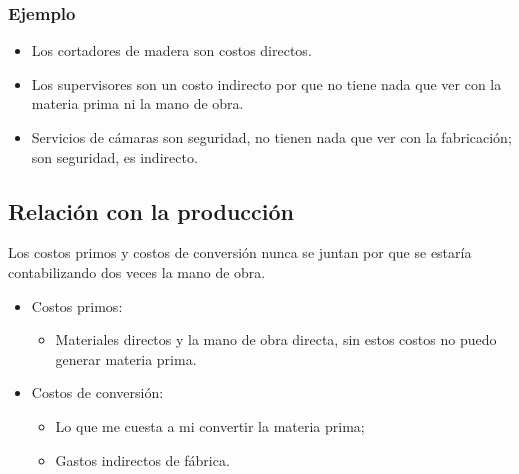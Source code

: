 \subsubsection{Ejemplo}
\begin{itemize}
    \item Los cortadores de madera son costos directos.
    \item Los supervisores son un costo indirecto por que no tiene nada que ver con la materia prima ni la mano de obra.
    \item Servicios de cámaras son seguridad, no tienen nada que ver con la fabricación; son seguridad, es indirecto.
\end{itemize}

\subsection{Relación con la producción}
Los costos primos y costos de conversión nunca se juntan por que se estaría contabilizando dos veces la mano de obra. 
\begin{itemize}
    \item Costos primos:
        \begin{itemize}
            \item Materiales directos y la mano de obra directa, sin estos costos no puedo generar materia prima.
        \end{itemize}
    
    \item Costos de conversión:
        \begin{itemize}
            \item Lo que me cuesta a mi convertir la materia prima; 
            \item Gastos indirectos de fábrica.
        \end{itemize}
\end{itemize}

